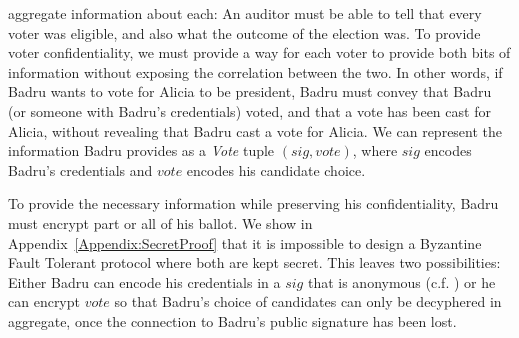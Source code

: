 \begin{itemize}
    aggregate information about each: An auditor must be able to tell that every
    voter was eligible, and also what the outcome of the election was. To
    provide voter confidentiality, we must provide a way for each voter to
    provide both bits of information without exposing the correlation between
    the two. In other words, if Badru wants to vote for Alicia to be president,
    Badru must convey that Badru (or someone with Badru's credentials) voted,
    and that a vote has been cast for Alicia, without revealing that Badru cast
    a vote for Alicia. We can represent the information Badru provides as a
    \emph{Vote} tuple $(sig, vote)$, where $sig$ encodes Badru's credentials and
    $vote$ encodes his candidate choice.

    To provide the necessary information while preserving his
    confidentiality, Badru must encrypt part or all of his ballot.
    We show
    in Appendix~\ref{Appendix:SecretProof} that it is impossible to design
    a Byzantine Fault Tolerant protocol where both are kept secret. This leaves
    two possibilities:
    Either Badru can encode his credentials in a $sig$ that is anonymous
    (c.f. \cite{lrs})
    or he can encrypt $vote$ so that Badru's choice of candidates can only be
    decyphered in aggregate, once the connection to Badru's public signature has
    been lost.


\end{itemize}

